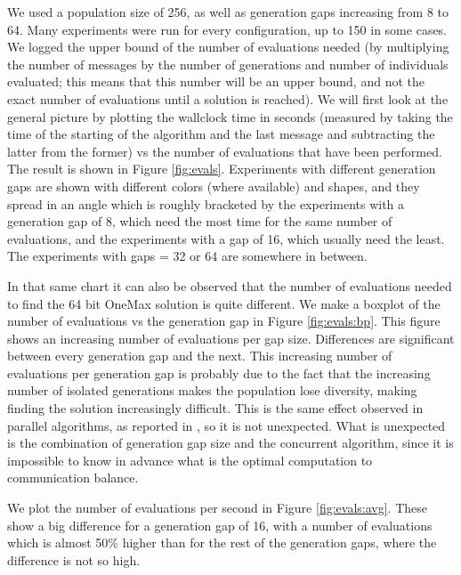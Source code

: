 \documentclass[sigconf]{acmart}
\begin{document}
%
%

We used a population size of 256, as well as generation gaps
increasing from 8 to 64. Many experiments were run for every
configuration, up to 150 in some cases. We logged the upper bound of
the number of evaluations needed (by multiplying the number of
messages by the number of generations and number of individuals
evaluated; this means that this number will be an upper bound, and not
the exact number of evaluations until a solution is reached). We will
first look at the general picture by plotting the wallclock time in seconds
(measured by taking the time of the starting of the algorithm and the
last message and subtracting the latter from the former) vs the
number of evaluations that have been performed. The result is shown in
Figure \ref{fig:evals}. Experiments with different generation gaps are
shown with different colors (where available) and shapes, and they
spread in an angle which is roughly bracketed by the experiments with
a generation gap of 8, which need the most time for the same number of
evaluations, and the experiments with a gap of 16, which usually need
the least. The experiments with gaps = 32 or 64 are somewhere in
between.

In that same chart it can also be observed that the number of
evaluations needed to find the 64 bit OneMax solution is quite
different. We make a boxplot of the number of evaluations vs the
generation gap in Figure \ref{fig:evals:bp}. This figure shows an
increasing number of evaluations per gap size. Differences are
significant between every generation gap and the next. This
increasing number of evaluations per generation gap is probably due to
the fact that the increasing number of isolated generations makes the
population lose diversity, making finding the solution increasingly
difficult. This is the same effect observed in parallel algorithms, as
reported in \cite{Cantu-Paz:1999:MPT:2933923.2934003}, so it is not
unexpected. What is unexpected is the combination of generation gap
size and the concurrent algorithm, since it is impossible to know in
advance what is the optimal computation to communication balance.

We plot the number of evaluations per second in Figure
\ref{fig:evals:avg}. These show a big difference for a generation gap
of 16, with a number of evaluations which is almost 50\% higher than
for the rest of the generation gaps, where the difference is not so
high. 
\end{document}
